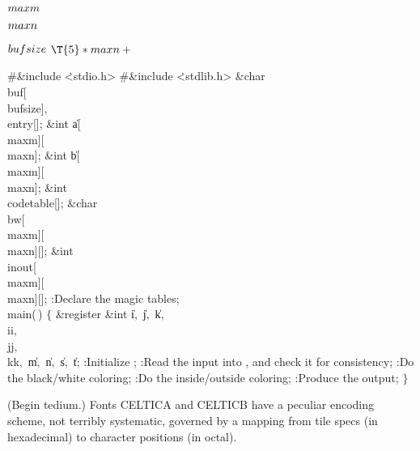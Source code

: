 \Y\B\4\D$\\{maxm}$ \5
\par
\B\4\D$\\{maxn}$ \5
\par
\B\4\D$\\{bufsize}$ \5
$\T{5}*\\{maxn}+{}$\par
\Y\B\8\#\&{include} \.{<stdio.h>}\6
\8\#\&{include} \.{<stdlib.h>}\6
\&{char} \\{buf}[\\{bufsize}]${},{}$ \\{entry}[];\6
\&{int} \|a[\\{maxm}][\\{maxn}];\6
\&{int} \|b[\\{maxm}][\\{maxn}];\6
\&{int} \\{codetable}[];\6
\&{char} \\{bw}[\\{maxm}][\\{maxn}][];\6
\&{int} \\{inout}[\\{maxm}][\\{maxn}][];\7
:Declare the magic tables\X;\7
\\{main}(\,)\1\1\2\2\6
${}\{{}$\1\6
\&{register} \&{int} \|i${},{}$ \|j${},{}$ \|k${},{}$ \\{ii}${},{}$ %
\\{jj}${},{}$ \\{kk}${},{}$ \|m${},{}$ \|n${},{}$ \|s${},{}$ \|t;\7
:Initialize \X;\6
:Read the input into , and check it for consistency\X;\6
:Do the black/white coloring\X;\6
:Do the inside/outside coloring\X;\6
:Produce the output\X;\6
\4${}\}{}$\2\par
\fi

(Begin tedium.)
Fonts {\mc CELTICA} and {\mc CELTICB} have a peculiar encoding scheme,
not terribly systematic, governed by a mapping from tile specs (in
hexadecimal) to character positions (in octal).

